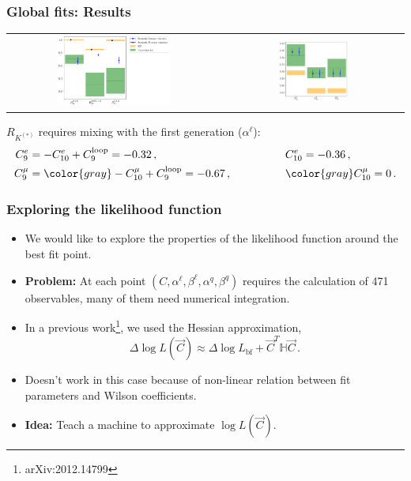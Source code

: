 \documentclass[mathserif, 10pt]{beamer}
\begin{document}
\begin{frame}
    \frametitle{Global fits: Results}

    \begin{center}
        \begin{tabular}{cc}
            \includegraphics[width=0.55\textwidth]{figures/rotRKplot.pdf} &
            \includegraphics[width=0.4\textwidth]{figures/rotRDplot.pdf}
        \end{tabular}
    \end{center}
    $R_{K^{(*)}}$ requires mixing with the first generation ($\alpha^\ell$):
    \begin{align*}
        C_9^e   & = -C_{10}^e + C_9^\mathrm{loop} = -0.32\,, \qquad\qquad                 &  & C_{10}^e =-0.36\,,             \\
        C_9^\mu & = {\color{gray}-C_{10}^\mu} + C_9^\mathrm{loop} = -0.67\,, \qquad\qquad &  & {\color{gray}C_{10}^\mu =0}\,.
    \end{align*}
\end{frame}

\begin{frame}
    \frametitle{Exploring the likelihood function}

    \begin{itemize}
        \item We would like to explore the properties of the likelihood function around the best fit point.
        \item {\bf Problem:} At each point $(C, \alpha^\ell, \beta^\ell, \alpha^q, \beta^q)$ requires the calculation of 471 observables, many of them need numerical integration.
        \item In a previous work\footnote[1]{arXiv:2012.14799}, we used the Hessian approximation,
        $$\Delta\log L (\vec{C}) \approx \Delta\log L_\mathrm{bf} + \vec{C}^T \mathbb{H} \vec{C}\,.$$
        \item Doesn't work in this case because of non-linear relation between fit parameters and Wilson coefficients.
        \item {\bf Idea:} Teach a machine to approximate $\log L(\vec{C})$.
    \end{itemize}

\end{frame}
\end{document}
